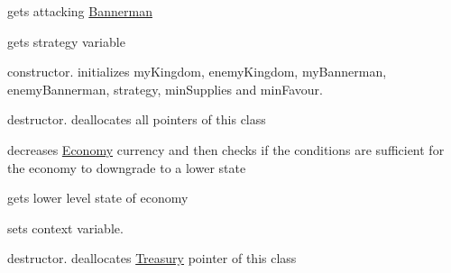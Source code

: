 \begin{DoxyRefList}
%
gets attacking \mbox{\hyperlink{class_bannerman}{Bannerman}}  
\item[Member \mbox{\hyperlink{class_strategy_a310550043f6b81592cef05ea9241144f}{Strategy\+::get\+Strategy\+Name}} ()]\label{todo__todo000025}%
%
gets strategy variable  
\item[Member \mbox{\hyperlink{class_strategy_abf2f11a2d8b44147caf0ea37863c90e2}{Strategy\+::Strategy}} (\mbox{\hyperlink{class_kingdom}{Kingdom}} $\ast$my\+Kingdom, \mbox{\hyperlink{class_kingdom}{Kingdom}} $\ast$enemy\+Kingdom, \mbox{\hyperlink{class_bannerman}{Bannerman}} $\ast$my\+Bannerman, \mbox{\hyperlink{class_bannerman}{Bannerman}} $\ast$enemy\+Bannerman, string name, int min, int min\+Favour)]\label{todo__todo000023}%
%
constructor. initializes my\+Kingdom, enemy\+Kingdom, my\+Bannerman, enemy\+Bannerman, strategy, min\+Supplies and min\+Favour.  
\item[Member \mbox{\hyperlink{class_strategy_a37c0bbdd64fd7dfcdd91578784a64775}{Strategy\+::$\sim$\+Strategy}} ()]\label{todo__todo000028}%
%
destructor. deallocates all pointers of this class  
\item[Member \mbox{\hyperlink{class_unstable_state_a4e134532fc0e3f2471e06ad0996ae161}{Unstable\+State\+::decrease\+Currency}} ()]\label{todo__todo000030}%
%
decreases \mbox{\hyperlink{class_economy}{Economy}} currency and then checks if the conditions are sufficient for the economy to downgrade to a lower state  
\item[Member \mbox{\hyperlink{class_unstable_state_a655d00d68c7c2e08da6b4db0df14a600}{Unstable\+State\+::get\+Demotion\+State}} ()]\label{todo__todo000031}%
%
gets lower level state of economy  
\item[Member \mbox{\hyperlink{class_unstable_state_adaff0187ed507f9d0b3ae25e8a901a17}{Unstable\+State\+::set\+Context}} (\mbox{\hyperlink{class_economy}{Economy}} $\ast$context)]\label{todo__todo000029}%
%
sets context variable.  
\item[Member \mbox{\hyperlink{class_war_indicators_aa8ee75ff5bf3d7bc1fb7f82a6527e582}{War\+Indicators\+::$\sim$\+War\+Indicators}} ()]\label{todo__todo000032}%
%
destructor. deallocates \mbox{\hyperlink{class_treasury}{Treasury}} pointer of this class 
\end{DoxyRefList}